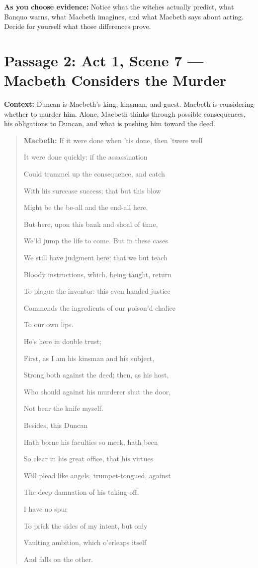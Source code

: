 \documentclass[11pt]{article}
\newenvironment{playpassage}{%
  \begin{quote}\small\setlength{\parskip}{0.08em}\setlength{\parindent}{0pt}%
}{\end{quote}}
\newcommand{\speaker}[1]{\textbf{#1:}}
\begin{document}
\textbf{As you choose evidence:} Notice what the witches actually predict, what Banquo warns, what Macbeth imagines, and what Macbeth says about acting. Decide for yourself what those differences prove.

\newpage

\section*{Passage 2: Act 1, Scene 7 --- Macbeth Considers the Murder}

\textbf{Context:} Duncan is Macbeth's king, kinsman, and guest. Macbeth is considering whether to murder him. Alone, Macbeth thinks through possible consequences, his obligations to Duncan, and what is pushing him toward the deed.

\begin{playpassage}
\speaker{Macbeth} If it were done when 'tis done, then 'twere well\par
It were done quickly: if the assassination\par
Could trammel up the consequence, and catch\par
With his surcease success; that but this blow\par
Might be the be-all and the end-all here,\par
But here, upon this bank and shoal of time,\par
We'ld jump the life to come. But in these cases\par
We still have judgment here; that we but teach\par
Bloody instructions, which, being taught, return\par
To plague the inventor: this even-handed justice\par
Commends the ingredients of our poison'd chalice\par
To our own lips.

He's here in double trust;\par
First, as I am his kinsman and his subject,\par
Strong both against the deed; then, as his host,\par
Who should against his murderer shut the door,\par
Not bear the knife myself.

Besides, this Duncan\par
Hath borne his faculties so meek, hath been\par
So clear in his great office, that his virtues\par
Will plead like angels, trumpet-tongued, against\par
The deep damnation of his taking-off.

I have no spur\par
To prick the sides of my intent, but only\par
Vaulting ambition, which o'erleaps itself\par
And falls on the other.
\end{playpassage}
\end{document}
